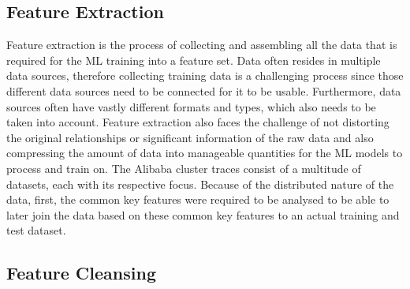     \subsection{Feature Extraction}
    \label{sec:feature-extraction-preprocessing-architecture}

      Feature extraction is the process of collecting and assembling all the data that is required for the ML training into a feature set.
      Data often resides in multiple data sources, therefore collecting training data is a challenging process since those different data sources need to be connected for it to be usable. Furthermore, data sources often have vastly different formats and types, which also needs to be taken into account. 
      Feature extraction also faces the challenge of not distorting the original relationships or significant information of the raw data and also compressing the amount of data into manageable quantities for the ML models to process and train on.
      The Alibaba cluster traces consist of a multitude of datasets, each with its respective focus. Because of the distributed nature of the data, first, the common key features were required to be analysed to be able to later join the data based on these common key features to an actual training and test dataset.

    \subsection{Feature Cleansing}
    \label{sec:feature-cleansing-preprocessing-architecture}

